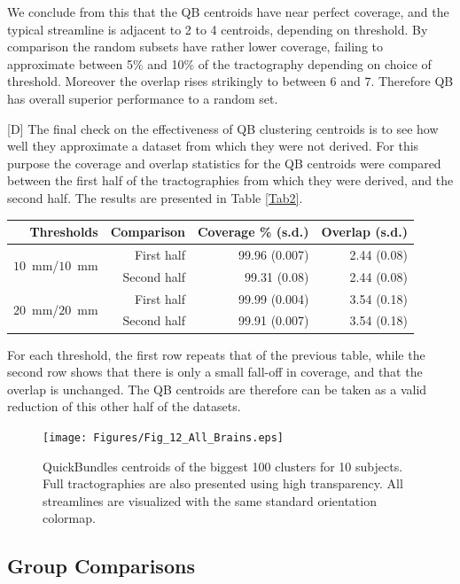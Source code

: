 \documentclass{bioinfo}
\begin{document}
We conclude from this that the QB centroids have near perfect coverage,
and the typical streamline is adjacent to 2 to 4 centroids,
depending on threshold. By comparison the random subsets have rather
lower coverage, failing to approximate between 5\% and 10\% of the
tractography depending on choice of threshold. Moreover the overlap
rises strikingly to between 6 and 7. Therefore QB has overall superior
performance to a random set.

[D] The final check on the effectiveness of QB clustering centroids is
to see how well they approximate a dataset from which they were not
derived.  For this purpose the coverage and overlap statistics for the
QB centroids were compared between the first half of the tractographies
from which they were derived, and the second half. The results are
presented in Table \ref{Tab2}.

\begin{table}[th]
{\begin{tabular}{rrrr}
Thresholds & Comparison & Coverage \% (s.d.) & Overlap (s.d.) \\
\hline
\multirow{2}{*}{$10$~mm/$10$~mm} & First half & 99.96 (0.007) & 2.44 (0.08)\\   
& Second half & 99.31 (0.08) & 2.44 (0.08)\\   
\hline
\multirow{2}{*}{$20$~mm/$20$~mm} & First half & 99.99 (0.004) & 3.54 (0.18)\\   
& Second half & 99.91 (0.007) & 3.54 (0.18)\\
\hline   
\end{tabular}}{}
\end{table}

For each threshold, the first row repeats that of the previous table,
while the second row shows that there is only a small fall-off in
coverage, and that the overlap is unchanged. The QB centroids are
therefore can be taken as a valid reduction of this other half of the
datasets.

\begin{figure}[htp]
  \centerline{\texttt{[image: Figures/Fig\_12\_All\_Brains.eps]}}
  \caption{QuickBundles centroids of the biggest 100 clusters for 10
    subjects. Full tractographies are also presented using high
    transparency. All streamlines are visualized with the same standard
    orientation colormap. \label{Flo:BAs}}
\end{figure}


\subsection{Group Comparisons \label{sub:group_comp}}
\end{document}
